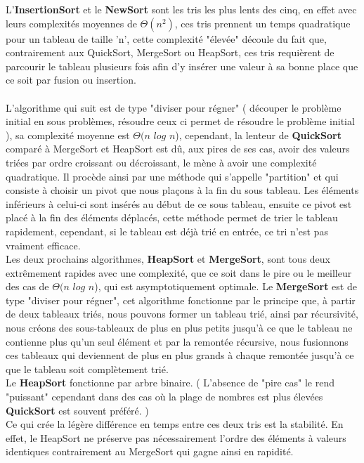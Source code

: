 \documentclass[a4paper, 11pt, oneside]{article}
\begin{document}
L'\textbf{InsertionSort} et le \textbf{NewSort} sont les tris les plus lents des cinq, en effet avec leurs complexités moyennes de $\Theta(n^{2})$, ces tris prennent un temps quadratique pour un tableau de taille 'n', cette complexité "élevée" découle du fait que, contrairement aux QuickSort, MergeSort ou HeapSort, ces tris requièrent de parcourir le tableau plusieurs fois afin d'y insérer une valeur à sa bonne place que ce soit par fusion ou insertion. 
\\ \\
\indent L'algorithme qui suit est de type "diviser pour régner" ( découper le problème initial en sous problèmes, résoudre ceux ci permet de résoudre le problème initial ), sa complexité moyenne est $\Theta(n$ $log$ $n$), cependant, la lenteur de \textbf{QuickSort} comparé à MergeSort et HeapSort est dû, aux pires de ses cas, avoir des valeurs triées par ordre croissant ou décroissant, le mène à avoir une complexité quadratique. Il procède ainsi par une méthode qui s'appelle "partition" et qui consiste à choisir un pivot que nous plaçons à la fin du sous tableau. Les éléments inférieurs à celui-ci sont insérés au début de ce sous tableau, ensuite ce pivot est placé à la fin des éléments déplacés, cette méthode permet de trier le tableau rapidement, cependant, si le tableau est déjà trié en entrée, ce tri n'est pas vraiment efficace.\\ 

Les deux prochains algorithmes, \textbf{HeapSort} et \textbf{MergeSort}, sont tous deux extrêmement rapides avec une complexité, que ce soit dans le pire ou le meilleur des cas de $\Theta(n$ $log$ $n$),  qui est asymptotiquement optimale. Le \textbf{MergeSort} est de type "diviser pour régner", cet algorithme fonctionne par le principe que, à partir de deux tableaux triés, nous pouvons former un tableau trié, ainsi par récursivité, nous créons des sous-tableaux de plus en plus petits jusqu'à ce que le tableau ne contienne plus qu'un seul élément et par la remontée récursive, nous fusionnons ces tableaux qui deviennent de plus en plus grands à chaque remontée jusqu'à ce que le tableau soit complètement trié.\\ Le \textbf{HeapSort} fonctionne par arbre binaire. ( L'absence de "pire cas" le rend "puissant" cependant dans des cas où la plage de nombres est plus élevées \textbf{QuickSort} est souvent préféré. ) \\
Ce qui crée la légère différence en temps entre ces deux tris est la stabilité. En effet, le HeapSort ne préserve pas nécessairement l’ordre des éléments à valeurs identiques contrairement au MergeSort qui gagne ainsi en rapidité.
\end{document}
